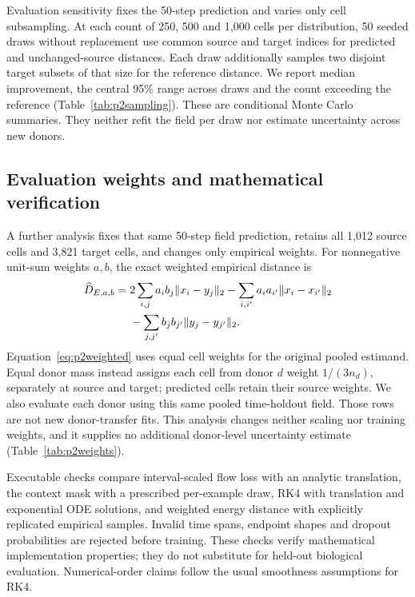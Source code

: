 Evaluation sensitivity fixes the 50-step prediction and varies only cell subsampling. At each count of 250, 500 and 1,000 cells per distribution, 50 seeded draws without replacement use common source and target indices for predicted and unchanged-source distances. Each draw additionally samples two disjoint target subsets of that size for the reference distance. We report median improvement, the central 95\% range across draws and the count exceeding the reference (Table~\ref{tab:p2sampling}). These are conditional Monte Carlo summaries. They neither refit the field per draw nor estimate uncertainty across new donors.

\subsection{Evaluation weights and mathematical verification}
A further analysis fixes that same 50-step field prediction, retains all 1,012 source cells and 3,821 target cells, and changes only empirical weights. For nonnegative unit-sum weights $a,b$, the exact weighted empirical distance is
\begin{align}
\widehat D_{E,a,b}={}&2\sum_{i,j}a_i b_j\|x_i-y_j\|_2
-\sum_{i,i'}a_i a_{i'}\|x_i-x_{i'}\|_2\notag\\
&-\sum_{j,j'}b_jb_{j'}\|y_j-y_{j'}\|_2.\label{eq:p2weighted}
\end{align}
Equation~\eqref{eq:p2weighted} uses equal cell weights for the original pooled estimand. Equal donor mass instead assigns each cell from donor $d$ weight $1/(3n_d)$, separately at source and target; predicted cells retain their source weights. We also evaluate each donor using this same pooled time-holdout field. Those rows are not new donor-transfer fits. This analysis changes neither scaling nor training weights, and it supplies no additional donor-level uncertainty estimate (Table~\ref{tab:p2weights}).

Executable checks compare interval-scaled flow loss with an analytic translation, the context mask with a prescribed per-example draw, RK4 with translation and exponential ODE solutions, and weighted energy distance with explicitly replicated empirical samples. Invalid time spans, endpoint shapes and dropout probabilities are rejected before training. These checks verify mathematical implementation properties; they do not substitute for held-out biological evaluation. Numerical-order claims follow the usual smoothness assumptions for RK4.

